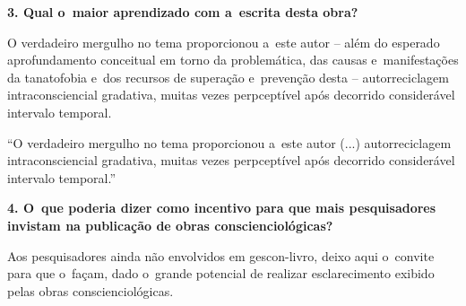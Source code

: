 \documentclass{gescons}
\begin{document}
\begin{multicols}{2}
\textbf{3. Qual o~maior aprendizado com a~escrita desta obra?}

O verdadeiro mergulho no tema proporcionou a~este autor -- além do esperado aprofundamento conceitual em torno da problemática, das causas e~manifestações da tanatofobia e~dos recursos de superação e~prevenção desta -- autorreciclagem intraconsciencial gradativa, muitas vezes perpceptível após decorrido considerável intervalo temporal.

\begin{pullquote}
    ``O verdadeiro mergulho no tema proporcionou a~este autor  (...)  autorreciclagem intraconsciencial gradativa, muitas vezes perpceptível após decorrido considerável intervalo temporal.''
\end{pullquote}

\textbf{4. O~que poderia dizer como incentivo para que mais pesquisadores invistam na publicação de obras conscienciológicas?}

Aos pesquisadores ainda não envolvidos em gescon-livro, deixo aqui o~convite para que o~façam, dado o~grande potencial de realizar esclarecimento exibido pelas obras conscienciológicas.



    \end{multicols}
\end{document}
